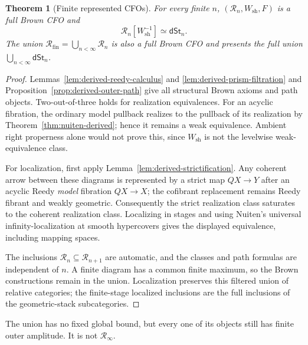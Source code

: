 \documentclass[12pt]{amsart}
\newtheorem{thm}{Theorem}[section]
\theoremstyle{definition}
\theoremstyle{remark}
\numberwithin{equation}{section}
\newcommand{\dSt}{\mathsf{dSt}}
\begin{document}
\begin{thm}[Finite represented CFOs]\label{thm:derived-reedy-finite}
For every finite $n$, $(\mathscr R_n,W_{\mathrm{sh}},F)$
is a full Brown CFO and
\[
 \mathscr R_n[W_{\mathrm{sh}}^{-1}]\simeq\dSt_n.
\]
The union $\mathscr R_{\mathrm{fin}}=\bigcup_{n<\infty}
\mathscr R_n$ is also a full Brown CFO and presents
the full union $\bigcup_{n<\infty}\dSt_n$.
\end{thm}

\begin{proof}
Lemmas~\ref{lem:derived-reedy-calculus} and
\ref{lem:derived-prism-filtration} and
Proposition~\ref{prop:derived-outer-path}
give all structural Brown axioms and path objects.
Two-out-of-three holds for realization equivalences.
For an acyclic fibration, the ordinary model pullback
realizes to the pullback of its realization by
Theorem~\ref{thm:nuiten-derived}; hence it remains
a weak equivalence. Ambient right properness alone
would not prove this, since $W_{\mathrm{sh}}$ is not
the levelwise weak-equivalence class.

For localization, first apply
Lemma~\ref{lem:derived-strictification}.
Any coherent arrow between these diagrams is represented
by a strict map $QX\to Y$ after an acyclic Reedy
\emph{model} fibration $QX\to X$; the cofibrant
replacement remains Reedy fibrant and weakly geometric.
Consequently the strict realization class saturates
to the coherent realization class.
Localizing in stages and using Nuiten's universal
infinity-localization at smooth hypercovers gives
the displayed equivalence, including mapping spaces.

The inclusions $\mathscr R_n\subseteq\mathscr R_{n+1}$
are automatic, and the classes and path formulas
are independent of $n$. A finite diagram has a common
finite maximum, so the Brown constructions remain
in the union. Localization preserves this filtered
union of relative categories; the finite-stage
localized inclusions are the full inclusions of
the geometric-stack subcategories.
\end{proof}

The union has no fixed global bound, but every one
of its objects still has finite outer amplitude.
It is not $\mathscr R_\infty$.
\end{document}
